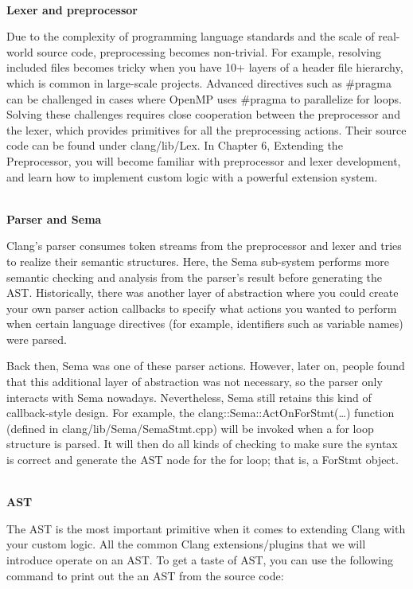 \hspace*{\fill} \\ %
\noindent
\textbf{Lexer and preprocessor}

Due to the complexity of programming language standards and the scale of real-world source code, preprocessing becomes non-trivial. For example, resolving included files becomes tricky when you have 10+ layers of a header file hierarchy, which is common in large-scale projects. Advanced directives such as \#pragma can be challenged in cases where OpenMP uses \#pragma to parallelize for loops. Solving these challenges requires close cooperation between the preprocessor and the lexer, which provides primitives for all the preprocessing actions. Their source code can be found under clang/lib/Lex. In Chapter 6, Extending the Preprocessor, you will become familiar with preprocessor and lexer development, and learn how to implement custom logic with a powerful extension system.

\hspace*{\fill} \\ %
\noindent
\textbf{Parser and Sema}

Clang's parser consumes token streams from the preprocessor and lexer and tries to realize their semantic structures. Here, the Sema sub-system performs more semantic checking and analysis from the parser's result before generating the AST. Historically, there was another layer of abstraction where you could create your own parser action callbacks to specify what actions you wanted to perform when certain language directives (for example, identifiers such as variable names) were parsed.

Back then, Sema was one of these parser actions. However, later on, people found that this additional layer of abstraction was not necessary, so the parser only interacts with Sema nowadays. Nevertheless, Sema still retains this kind of callback-style design. For example, the clang::Sema::ActOnForStmt(…) function (defined in clang/lib/Sema/SemaStmt.cpp) will be invoked when a for loop structure is parsed. It will then do all kinds of checking to make sure the syntax is correct and generate the AST node for the for loop; that is, a ForStmt object.

\hspace*{\fill} \\ %
\noindent
\textbf{AST}

The AST is the most important primitive when it comes to extending Clang with your custom logic. All the common Clang extensions/plugins that we will introduce operate on an AST. To get a taste of AST, you can use the following command to print out the an AST from the source code:

